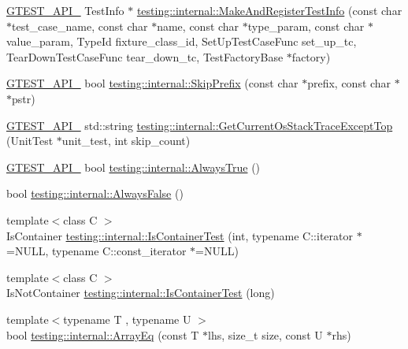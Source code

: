\begin{DoxyCompactItemize}
\item 
\hyperlink{gtest-port_8h_aa73be6f0ba4a7456180a94904ce17790}{G\+T\+E\+S\+T\+\_\+\+A\+P\+I\+\_\+} Test\+Info $\ast$ \hyperlink{namespacetesting_1_1internal_a7e37d3160f9d17529d3521c93e245dba}{testing\+::internal\+::\+Make\+And\+Register\+Test\+Info} (const char $\ast$test\+\_\+case\+\_\+name, const char $\ast$name, const char $\ast$type\+\_\+param, const char $\ast$value\+\_\+param, Type\+Id fixture\+\_\+class\+\_\+id, Set\+Up\+Test\+Case\+Func set\+\_\+up\+\_\+tc, Tear\+Down\+Test\+Case\+Func tear\+\_\+down\+\_\+tc, Test\+Factory\+Base $\ast$factory)
\item 
\hyperlink{gtest-port_8h_aa73be6f0ba4a7456180a94904ce17790}{G\+T\+E\+S\+T\+\_\+\+A\+P\+I\+\_\+} bool \hyperlink{namespacetesting_1_1internal_aac72b20299ad4a99554ce161e1769560}{testing\+::internal\+::\+Skip\+Prefix} (const char $\ast$prefix, const char $\ast$$\ast$pstr)
\item 
\hyperlink{gtest-port_8h_aa73be6f0ba4a7456180a94904ce17790}{G\+T\+E\+S\+T\+\_\+\+A\+P\+I\+\_\+} std\+::string \hyperlink{namespacetesting_1_1internal_ae7ae495d3207e26968dfbd537c5e6dee}{testing\+::internal\+::\+Get\+Current\+Os\+Stack\+Trace\+Except\+Top} (Unit\+Test $\ast$unit\+\_\+test, int skip\+\_\+count)
\item 
\hyperlink{gtest-port_8h_aa73be6f0ba4a7456180a94904ce17790}{G\+T\+E\+S\+T\+\_\+\+A\+P\+I\+\_\+} bool \hyperlink{namespacetesting_1_1internal_a4d46f09c3bfe68700b7f728d2cc3782f}{testing\+::internal\+::\+Always\+True} ()
\item 
bool \hyperlink{namespacetesting_1_1internal_a4b24c851ab13569b1b15b3d259b60d2e}{testing\+::internal\+::\+Always\+False} ()
\item 
{\footnotesize template$<$class C $>$ }\\Is\+Container \hyperlink{namespacetesting_1_1internal_acb6ea1086293c1d6636e3c67941351fb}{testing\+::internal\+::\+Is\+Container\+Test} (int, typename C\+::iterator $\ast$=N\+U\+L\+L, typename C\+::const\+\_\+iterator $\ast$=N\+U\+L\+L)
\item 
{\footnotesize template$<$class C $>$ }\\Is\+Not\+Container \hyperlink{namespacetesting_1_1internal_af545a2ae928b8a9e7581978234464275}{testing\+::internal\+::\+Is\+Container\+Test} (long)
\item 
{\footnotesize template$<$typename T , typename U $>$ }\\bool \hyperlink{namespacetesting_1_1internal_af4bebf36baf0b0a5b26d051dde55fa47}{testing\+::internal\+::\+Array\+Eq} (const T $\ast$lhs, size\+\_\+t size, const U $\ast$rhs)
$$
\end{DoxyCompactItemize}
